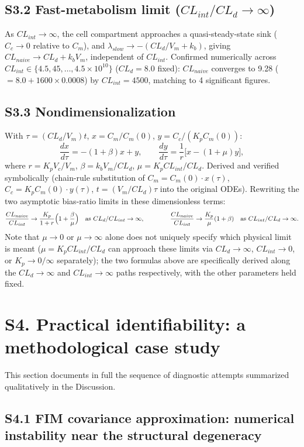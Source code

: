 \documentclass[11pt]{article}
\begin{document}
\subsection*{S3.2 Fast-metabolism limit ($CL_{int}/CL_d\to\infty$)}

As $CL_{int}\to\infty$, the cell compartment approaches a quasi-steady-state sink ($C_c\to 0$ relative to $C_m$), and $\lambda_{slow}\to-(CL_d/V_m+k_b)$, giving $CL_{naive} \to CL_d+k_bV_m$, independent of $CL_{int}$. Confirmed numerically across $CL_{int} \in \{4.5, 45, \dots, 4.5\times10^{10}\}$ ($CL_d=8.0$ fixed): $CL_{naive}$ converges to 9.28 ($=8.0+1600\times0.0008$) by $CL_{int}=4500$, matching to 4 significant figures.

\subsection*{S3.3 Nondimensionalization}

With $\tau=(CL_d/V_m)t$, $x=C_m/C_m(0)$, $y=C_c/(K_pC_m(0))$:
\[
\frac{dx}{d\tau} = -(1+\beta)x+y, \qquad \frac{dy}{d\tau} = \frac{1}{r}\bigl[x-(1+\mu)y\bigr],
\]
where $r=K_pV_c/V_m$, $\beta=k_bV_m/CL_d$, $\mu=K_pCL_{int}/CL_d$. Derived and verified symbolically (chain-rule substitution of $C_m=C_m(0)\cdot x(\tau)$, $C_c=K_pC_m(0)\cdot y(\tau)$, $t=(V_m/CL_d)\tau$ into the original ODEs). Rewriting the two asymptotic bias-ratio limits in these dimensionless terms:
\[
\frac{CL_{naive}}{CL_{int}} \to \frac{K_p}{1+r}\Bigl(1+\frac{\beta}{\mu}\Bigr) \quad \text{as } CL_d/CL_{int}\to\infty, \qquad\qquad
\frac{CL_{naive}}{CL_{int}} \to \frac{K_p}{\mu}(1+\beta) \quad \text{as } CL_{int}/CL_d\to\infty.
\]
Note that $\mu\to0$ or $\mu\to\infty$ alone does not uniquely specify which physical limit is meant ($\mu=K_pCL_{int}/CL_d$ can approach these limits via $CL_d\to\infty$, $CL_{int}\to0$, or $K_p\to0/\infty$ separately); the two formulas above are specifically derived along the $CL_d\to\infty$ and $CL_{int}\to\infty$ paths respectively, with the other parameters held fixed.

\section*{S4. Practical identifiability: a methodological case study}

This section documents in full the sequence of diagnostic attempts summarized qualitatively in the Discussion.

\subsection*{S4.1 FIM covariance approximation: numerical instability near the structural degeneracy}
\end{document}
